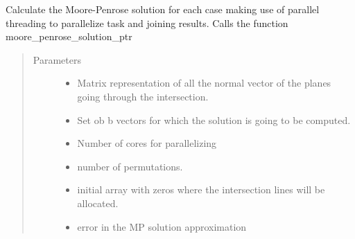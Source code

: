 \documentclass[letterpaper,10pt,english]{sphinxmanual}
\begin{document}
\begin{fulllineitems}
\label{\detokenize{functions:functions.mooore_penrose_solution_par}}
Calculate the Moore-Penrose solution for each case making use of parallel threading to parallelize task
and joining results. Calls the function moore\_penrose\_solution\_ptr
\begin{quote}\begin{description}
\item[{Parameters}] \leavevmode\begin{itemize}
\item {} 
 \textendash{} Matrix representation of all the normal vector of the planes going through the intersection.

\item {} 
 \textendash{} Set ob b vectors for which the solution is going to be computed.

\item {} 
 \textendash{} Number of cores for parallelizing

\item {} 
 \textendash{} number of permutations.

\item {} 
 \textendash{} initial array with zeros where the intersection lines will be allocated.

\item {} 
 \textendash{} error in the MP solution approximation

\end{itemize}

\end{description}\end{quote}

\end{fulllineitems}

\end{document}
